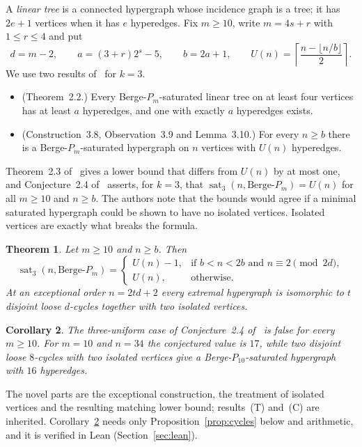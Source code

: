 \documentclass[11pt]{article}
\newtheorem{theorem}{Theorem}
\newtheorem{corollary}[theorem]{Corollary}
\theoremstyle{definition}
\theoremstyle{remark}
\newcommand{\sat}{\operatorname{sat}}
\newcommand{\BP}{\text{Berge-}P}
\begin{document}
A \emph{linear tree} is a connected hypergraph whose incidence graph is a
tree; it has $2e+1$ vertices when it has $e$ hyperedges. Fix $m\ge 10$,
write $m=4s+r$ with $1\le r\le4$ and put
\[
d=m-2,\qquad a=(3+r)2^s-5,\qquad b=2a+1,\qquad
U(n)=\left\lceil\frac{n-\lfloor n/b\rfloor}{2}\right\rceil .
\]
We use two results of~\cite{EGKMS} for $k=3$.
\begin{itemize}
\item[(T)] (Theorem~2.2.) Every Berge-$P_m$-saturated linear tree on at
least four vertices has at least $a$ hyperedges, and one with exactly $a$
hyperedges exists.
\item[(C)] (Construction~3.8, Observation~3.9 and Lemma~3.10.) For every
$n\ge b$ there is a Berge-$P_m$-saturated hypergraph on $n$ vertices with
$U(n)$ hyperedges.
\end{itemize}
Theorem~2.3 of~\cite{EGKMS} gives a lower bound that differs from $U(n)$ by
at most one, and Conjecture~2.4 of~\cite{EGKMS} asserts, for $k=3$, that
$\sat_3(n,\BP_m)=U(n)$ for all $m\ge10$ and $n\ge b$. The authors note that
the bounds would agree if a minimal saturated hypergraph could be shown to
have no isolated vertices. Isolated vertices are exactly what breaks the
formula.

\begin{theorem}\label{thm:main}
Let $m\ge10$ and $n\ge b$. Then
\[
\sat_3(n,\BP_m)=
\begin{cases}
U(n)-1, & \text{if } b<n<2b \text{ and } n\equiv 2 \pmod{2d},\\
U(n), & \text{otherwise.}
\end{cases}
\]
At an exceptional order $n=2td+2$ every extremal hypergraph is isomorphic
to $t$ disjoint loose $d$-cycles together with two isolated vertices.
\end{theorem}

\begin{corollary}\label{cor:counter}
The three-uniform case of Conjecture~2.4 of~\cite{EGKMS} is false for every
$m\ge10$. For $m=10$ and $n=34$ the conjectured value is $17$, while two
disjoint loose $8$-cycles with two isolated vertices give a
Berge-$P_{10}$-saturated hypergraph with $16$ hyperedges.
\end{corollary}

The novel parts are the exceptional construction, the treatment of
isolated vertices and the resulting matching lower bound; results~(T)
and~(C) are inherited. Corollary~\ref{cor:counter} needs only
Proposition~\ref{prop:cycles} below and arithmetic, and it is verified in
Lean (Section~\ref{sec:lean}).
\end{document}
